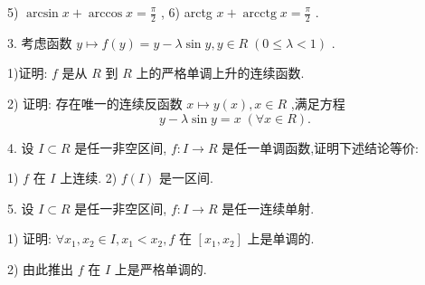 5) $\arcsin x + \arccos x = \frac{\pi }{2}$ , 6) arctg $x + \operatorname{arcctg}x = \frac{\pi }{2}$ .

3. 考虑函数 $y \mapsto  f\left( y\right)  = y - \lambda \sin y,y \in  R\;\left( {0 \leq  \lambda  < 1}\right)$ .

1)证明: $f$ 是从 $R$ 到 $R$ 上的严格单调上升的连续函数.

2) 证明: 存在唯一的连续反函数 $x \mapsto  y\left( x\right) ,x \in  R$ ,满足方程
$$y - \lambda \sin y = x\;\left( {\forall x \in  R}\right) .$$

4. 设 $I \subset  R$ 是任一非空区间, $f : I \rightarrow  R$ 是任一单调函数,证明下述结论等价:

1) $f$ 在 $I$ 上连续. 2) $f\left( I\right)$ 是一区间.

5. 设 $I \subset  R$ 是任一非空区间, $f : I \rightarrow  R$ 是任一连续单射.

1) 证明: $\forall {x}_{1},{x}_{2} \in  I,{x}_{1} < {x}_{2},f$ 在 $\left\lbrack  {{x}_{1},{x}_{2}}\right\rbrack$ 上是单调的.

2) 由此推出 $f$ 在 $I$ 上是严格单调的.

